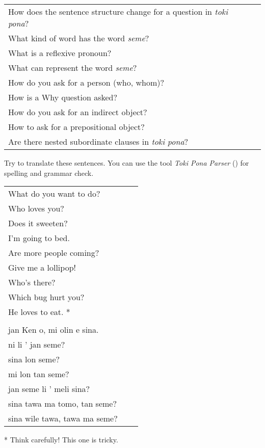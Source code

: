 \begin{supertabular}{p{5,5cm}|ll}
How does the sentence structure change for a question in \textit{toki pona}? &&  \\ %
What kind of word has the word \textit{seme}? &&  \\ %
What is a reflexive pronoun? &&  \\ %
What can represent the word \textit{seme}? &&   \\ %
How do you ask for a person (who, whom)? &&  \\ %
How is a Why question asked? &&  \\ %
How do you ask for an indirect object? &&  \\ %
How to ask for a prepositional object? &&  \\ %
Are there nested subordinate clauses in \textit{toki pona}? && \\ %
\end{supertabular}

Try to translate these sentences. 
You can use the tool \textit{Toki Pona Parser} (\cite{www:rowa:02}) for spelling and grammar check. 

\begin{supertabular}{p{5,5cm}|ll}
What do you want to do? &&   \\ %
Who loves you? &&   \\ %
Does it sweeten?  &&  \\ %
I'm going to bed. && \\  %
Are more people coming? &&  \\  %
Give me a lollipop! && \\   %
Who's there? &&   \\ %
Which bug hurt you?  &&  \\ %
He loves to eat. * &&  \\ %
 && \\ %
jan Ken o, mi olin e sina.  && \\  %
ni li ' jan seme?  && \\  %
sina lon seme?   && \\  %
mi lon tan seme?  && \\  %
jan seme li ' meli sina?   && \\    %
sina tawa ma tomo, tan seme?    && \\   %
sina wile tawa, tawa  ma seme?      && \\  %
\end{supertabular} 

* Think carefully! This one is tricky. 
